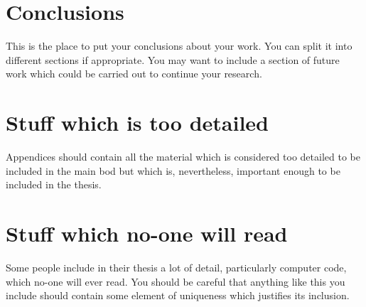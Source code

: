 \documentclass[12pt,a4paper]{report}
\begin{document}



\chapter{Conclusions}

This is the place to put your conclusions about your work. You can
split it into different sections if appropriate. You may want to include
a section of future work which could be carried out to continue your
research.

\appendix

\chapter{Stuff which is too detailed}

Appendices should contain all the material which is considered too
detailed to be included in the main bod but which is, nevertheless,
important enough to be included in the thesis.

\chapter{Stuff which no-one will read}

Some people include in their thesis a lot of detail, particularly
computer code, which no-one will ever read. You should be careful that
anything like this you include should contain some element of uniqueness
which justifies its inclusion.



\end{document}
